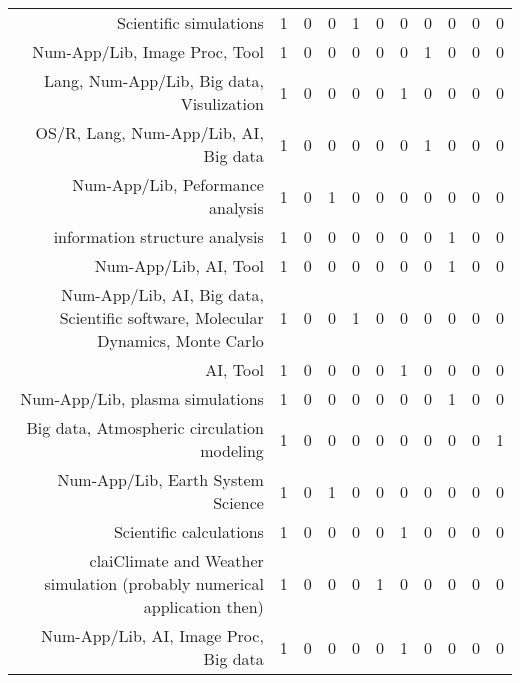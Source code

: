 {\begin{landscape}
\begin{longtable}[htb]{r|c|c|c|c|c|c|c|c|c|c}
{Scientific simulations} & 1 & 0 & 0 & 1 & 0 & 0 & 0 & 0 & 0 & 0 \\%
{Num-App/Lib, Image Proc, Tool} & 1 & 0 & 0 & 0 & 0 & 0 & 1 & 0 & 0 & 0 \\%
{Lang, Num-App/Lib, Big data, Visulization} & 1 & 0 & 0 & 0 & 0 & 1 & 0 & 0 & 0 & 0 \\%
{OS/R, Lang, Num-App/Lib, AI, Big data} & 1 & 0 & 0 & 0 & 0 & 0 & 1 & 0 & 0 & 0 \\%
{Num-App/Lib, Peformance analysis} & 1 & 0 & 1 & 0 & 0 & 0 & 0 & 0 & 0 & 0 \\%
{information structure analysis} & 1 & 0 & 0 & 0 & 0 & 0 & 0 & 1 & 0 & 0 \\%
{Num-App/Lib, AI, Tool} & 1 & 0 & 0 & 0 & 0 & 0 & 0 & 1 & 0 & 0 \\%
{Num-App/Lib, AI, Big data, Scientific software, Molecular Dynamics, Monte Carlo} & 1 & 0 & 0 & 1 & 0 & 0 & 0 & 0 & 0 & 0 \\%
{AI, Tool} & 1 & 0 & 0 & 0 & 0 & 1 & 0 & 0 & 0 & 0 \\%
{Num-App/Lib, plasma simulations} & 1 & 0 & 0 & 0 & 0 & 0 & 0 & 1 & 0 & 0 \\%
{Big data, Atmospheric circulation modeling} & 1 & 0 & 0 & 0 & 0 & 0 & 0 & 0 & 0 & 1 \\%
{Num-App/Lib, Earth System Science} & 1 & 0 & 1 & 0 & 0 & 0 & 0 & 0 & 0 & 0 \\%
{Scientific calculations} & 1 & 0 & 0 & 0 & 0 & 1 & 0 & 0 & 0 & 0 \\%
{claiClimate and Weather simulation (probably numerical application then)} & 1 & 0 & 0 & 0 & 1 & 0 & 0 & 0 & 0 & 0 \\%
{Num-App/Lib, AI, Image Proc, Big data} & 1 & 0 & 0 & 0 & 0 & 1 & 0 & 0 & 0 & 0 \\%
\hline%
\end{longtable}%
\end{landscape}}%
\clearpage%
